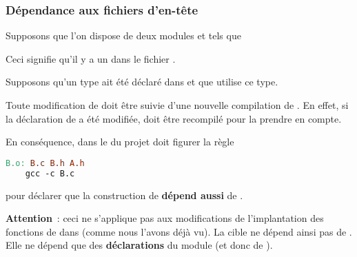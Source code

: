 \begin{frame}[fragile]
\frametitle{Dépendance aux fichiers d'en-tête}
Supposons que l'on dispose de deux modules  et  tels que
\begin{center}
\end{center}

Ceci signifie qu'il y a un  dans le fichier
.
\smallskip

Supposons qu'un type  ait été déclaré dans  et que 
utilise ce type.
\bigskip

Toute modification de  doit être suivie d'une nouvelle
compilation de . En effet, si la déclaration de  a été
modifiée,  doit être recompilé pour la prendre en compte.
\medskip

En conséquence, dans le  du projet doit figurer la règle
\begin{multicols}{2}
\begin{lstlisting}[language=make]
B.o: B.c B.h A.h
    gcc -c B.c
\end{lstlisting}
pour déclarer que la construction de  {\bf dépend aussi}
de .
\end{multicols}

{\bf Attention}~: ceci ne s'applique pas aux modifications de l'implantation
des fonctions de  dans  (comme nous l'avons déjà vu).
La cible  ne dépend ainsi pas de . Elle ne dépend
que des {\bf déclarations} du module  (et donc de ).
\end{frame}

